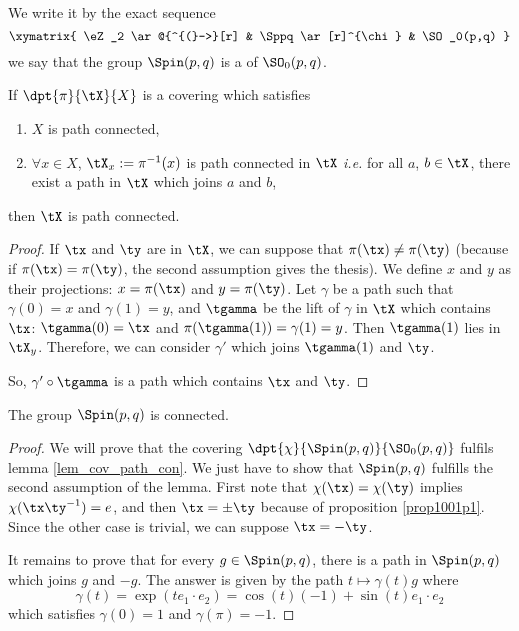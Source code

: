 We write it by the exact sequence
\begin{equation}
 \xymatrix{
    \eZ_2  \ar@{^{(}->}[r] & \Sppq \ar[r]^{\chi} & \SO_0(p,q)
  } 
\end{equation}
we say that the group $\Spin(p,q)$ is a  of $\SO_0(p,q)$.

\begin{lemma}
If $\dpt{\pi}{\tX}{X}$ is a covering which satisfies

\begin{enumerate}
\item $X$ is path connected,
\item $\forall x\in X$, $\tX_x:=\pi^{-1}(x)$ is path connected in $\tX$ \emph{i.e.} for all $a$, $b\in \tX$, there exist a path in $\tX$ which joins $a$ and $b$,
\end{enumerate}
then $\tX$ is path connected.
\label{lem_cov_path_con}
\end{lemma}
\begin{proof}
If $\tx$ and $\ty$ are in $\tX$, we can suppose that $\pi(\tx)\neq\pi(\ty)$ (because if $\pi(\tx)=\pi(\ty)$, the second assumption gives the thesis). We define $x$ and $y$ as their projections: $x=\pi(\tx)$ and $y=\pi(\ty)$. Let $\gamma$ be a path such that $\gamma(0)=x$ and $\gamma(1)=y$, and $\tgamma$ be the lift of $\gamma$ in $\tX$ which contains $\tx$: $\tgamma(0)=\tx$ and $\pi(\tgamma(1))=\gamma(1)=y$. Then $\tgamma(1)$ lies in $\tX_y$. Therefore, we can consider $\gamma'$ which joins $\tgamma(1)$ and $\ty$.

So, $\gamma'\circ\tgamma$ is a path which contains $\tx$ and $\ty$.
\end{proof}


\begin{proposition}
 The group $\Spin(p,q)$ is connected.
\end{proposition}

\begin{proof}
We will prove that the covering $\dpt{\chi}{\Spin(p,q)}{\SO_0(p,q)}$ fulfils lemma \ref{lem_cov_path_con}. We just have to show that $\Spin(p,q)$ fulfills the second assumption of the lemma. First note that $\chi(\tx)=\chi(\ty)$ implies $\chi(\tx\ty^{-1})=e$, and then $\tx=\pm\ty$ because of proposition \ref{prop1001p1}. Since the other case is trivial, we can suppose $\tx=-\ty$.

It remains to prove that for every $g\in\Spin(p,q)$, there is a path in $\Spin(p,q)$ which joins $g$ and $-g$. The answer is given by the path $t\mapsto \gamma(t)g$ where
\[
\gamma(t)=\exp(te_1\cdot e_2)=\cos(t)(-1)+\sin(t)e_1\cdot e_2
\]
which satisfies $\gamma(0)=1$ and $\gamma(\pi)=-1$. 
\end{proof}

